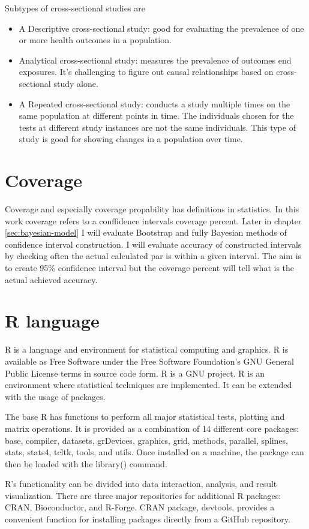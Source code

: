 Subtypes of cross-sectional studies are
\begin{itemize}
    \item A Descriptive cross-sectional study: good for evaluating the prevalence of one or more health outcomes in a population.
    \item Analytical cross-sectional study: measures the prevalence of outcomes end exposures. It's challenging to figure out causal relationships based on cross-sectional study alone. 
    \item A Repeated cross-sectional study: conducts a study multiple times on the same population at different points in time. The individuals chosen for the tests at different study instances are not the same individuals. This type of study is good for showing changes in a population over time.
\end{itemize} \cite{Wang2020CrossSectionalSS} 

\section{Coverage}
Coverage and especially coverage propability has definitions in statistics. In this work coverage refers to a conffidence intervals coverage percent. Later in chapter \ref{sec:bayesian-model} I will evaluate Bootstrap and fully Bayesian methods of confidence interval construction. I will evaluate accuracy of constructed intervals by checking often the actual calculated par is within a given interval. The aim is to create 95\% confidence interval but the coverage percent will tell what is the actual achieved accuracy.

\section{R language}\label{Rlanguage}

R is a language and environment for statistical computing and graphics. R is available as Free Software under the Free Software Foundation's GNU General Public License terms in source code form. R is a GNU project. R is an environment where statistical techniques are implemented. It can be extended with the usage of packages. \cite{RWebPage}

The base R has functions to perform all major statistical tests, plotting and matrix operations. It is provided as a combination of 14 different core packages: base, compiler, datasets, grDevices, graphics, grid, methods, parallel, splines, stats, stats4, tcltk, tools, and utils. Once installed on a machine, the package can then be loaded with the library() command.

R's functionality can be divided into data interaction, analysis, and result visualization. There are three major repositories for additional R packages: CRAN, Bioconductor, and R-Forge. CRAN package, devtools, provides a convenient function for installing packages directly from a GitHub repository. \cite{Giorgi2022TheRL}
